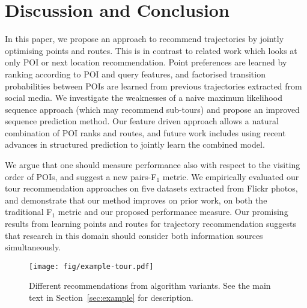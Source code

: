 
\section{Discussion and Conclusion}
\label{sec:conclusion}
\secmoveup

In this paper, we propose an approach to recommend trajectories
by jointly optimising points and routes.
This is in contrast to related work which looks at only POI %
or next location recommendation.
Point preferences are learned by ranking according to POI and query features,
and factorised transition probabilities between POIs
are learned from previous trajectories extracted
from social media.
We investigate the weaknesses of a naive maximum likelihood sequence approach (which
may recommend sub-tours) and propose an improved sequence prediction method.
Our feature driven approach allows a natural combination of POI ranks and routes, and
future work includes using recent advances in structured prediction to jointly
learn the combined model.

We argue that one should measure performance also with respect to the visiting order of POIs,
and suggest a new pairs-F$_1$ metric.
We empirically evaluated our tour recommendation approaches on five datasets extracted from
Flickr photos, and demonstrate that our method improves on prior work,
on both the traditional F$_1$ metric and our proposed performance measure.
Our promising results from learning points and routes for trajectory recommendation suggests
that research in this domain should consider both information sources simultaneously.


\begin{figure*}[t]
	\centering
	\texttt{[image: fig/example-tour.pdf]}
	\caption{Different recommendations from algorithm variants.
    See the main text in Section~\ref{sec:example} for description.}
	\label{fig:exampleresult}
\end{figure*}
